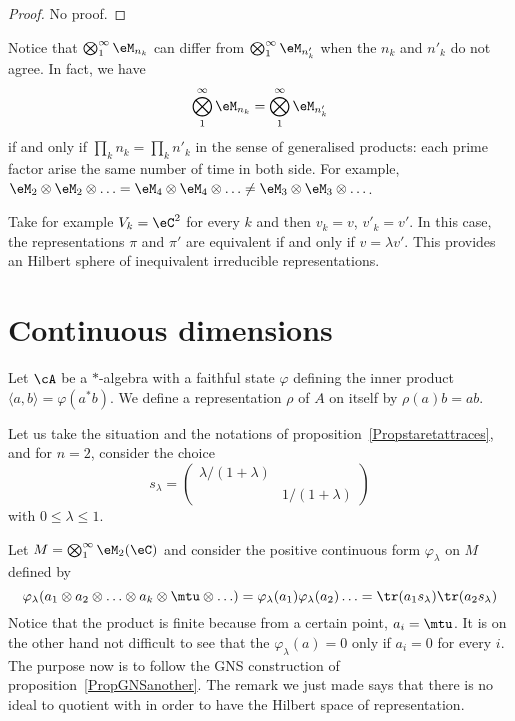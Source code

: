 \begin{proof}
	No proof.
\end{proof}

Notice that $\bigotimes_{1}^{\infty}\eM_{n_k}$ can differ from $\bigotimes_{1}^{\infty}\eM_{n'_k}$ when the $n_k$ and $n'_k$ do not agree. In fact, we have
\[
	\bigotimes_{1}^{\infty}\eM_{n_k} =\bigotimes_{1}^{\infty}\eM_{n'_k}
\]
if and only if $\prod_k n_k=\prod_k n'_k$ in the sense of generalised products: each prime factor arise the same number of time in both side. For example, $\eM_2\otimes\eM_2\otimes\ldots=\eM_4\otimes\eM_4\otimes\ldots\neq \eM_3\otimes\eM_3\otimes\ldots$.

Take for example $V_k=\eC^2$ for every $k$ and then $v_k=v$, $v'_k=v'$. In this case, the representations $\pi$ and $\pi'$ are equivalent if and only if $v=\lambda v'$. This provides an Hilbert sphere of inequivalent irreducible representations.

\section{Continuous dimensions}

Let $\cA$ be a $*$-algebra with a faithful state $\varphi$ defining the inner product $\langle a, b\rangle =\varphi(a^*b)$. We define a representation $\rho$ of $A$ on itself by $\rho(a)b=ab$.

Let us take the situation and the notations of proposition~\ref{Propstaretattraces}, and for $n=2$, consider the choice
\[
	s_{\lambda}=
	\begin{pmatrix}
		\lambda/(1+\lambda) \\
		 & 1/(1+\lambda)
	\end{pmatrix}
\]
with $0\leq\lambda\leq 1$.

Let $M=\bigotimes_1^{\infty}\eM_2(\eC)$ and consider the positive continuous form $\varphi_{\lambda}$ on $M$ defined by
\begin{equation}
	\varphi_{\lambda}(a_1\otimes a_2\otimes\ldots\otimes a_k\otimes\mtu\otimes\ldots)=\varphi_{\lambda}(a_1)\varphi_{\lambda}(a_2)\ldots=\tr(a_1s_{\lambda})\tr(a_2s_{\lambda})
\end{equation}
Notice that the product is finite because from a certain point, $a_i=\mtu$. It is on the other hand not difficult to see that the $\varphi_{\lambda}(a)=0$ only if $a_i=0$ for every $i$. The purpose now is to follow the GNS construction of proposition~\ref{PropGNSanother}. The remark we just made says that there is no ideal to quotient with in order to have the Hilbert space of representation.

